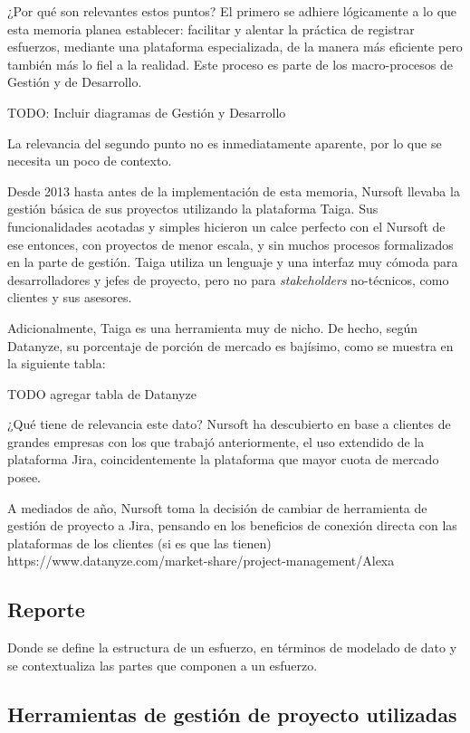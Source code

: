 ¿Por qué son relevantes estos puntos? El primero se adhiere lógicamente a lo que esta memoria planea
establecer: facilitar y alentar la práctica de registrar esfuerzos, mediante una plataforma especializada,
de la manera más eficiente pero también más lo fiel a la realidad. 
Este proceso es parte de los macro-procesos de Gestión y de Desarrollo. 

TODO: Incluir diagramas de Gestión y Desarrollo

La relevancia del segundo punto no es inmediatamente aparente, por lo que se necesita un poco de contexto.

Desde 2013 hasta antes de la implementación de esta memoria, Nursoft llevaba la gestión básica de sus
proyectos utilizando la plataforma Taiga.
Sus funcionalidades acotadas y simples hicieron un calce perfecto con el Nursoft de ese entonces,
con proyectos de menor escala, y sin muchos procesos formalizados en la parte de gestión. 
Taiga utiliza un lenguaje y una interfaz muy cómoda para desarrolladores y jefes de proyecto,
pero no para \textit{stakeholders} no-técnicos, como clientes y sus asesores.

Adicionalmente, Taiga es una herramienta muy de nicho. De hecho, según Datanyze, su porcentaje de 
porción de mercado es bajísimo, como se muestra en la siguiente tabla:

TODO agregar tabla de Datanyze

¿Qué tiene de relevancia este dato? Nursoft ha descubierto en base a clientes de grandes empresas
con los que trabajó anteriormente, el uso extendido de la plataforma Jira, coincidentemente la plataforma
que mayor cuota de mercado posee.

A mediados de año, Nursoft toma la decisión de cambiar de herramienta de gestión de proyecto a Jira,
pensando en los beneficios de conexión directa con las plataformas de los clientes (si es que las tienen)
https://www.datanyze.com/market-share/project-management/Alexa%

\subsection{Reporte}
Donde se define la estructura de un esfuerzo, en términos de modelado de dato y se contextualiza las partes que componen a un esfuerzo.

\subsection{Herramientas de gestión de proyecto utilizadas}

